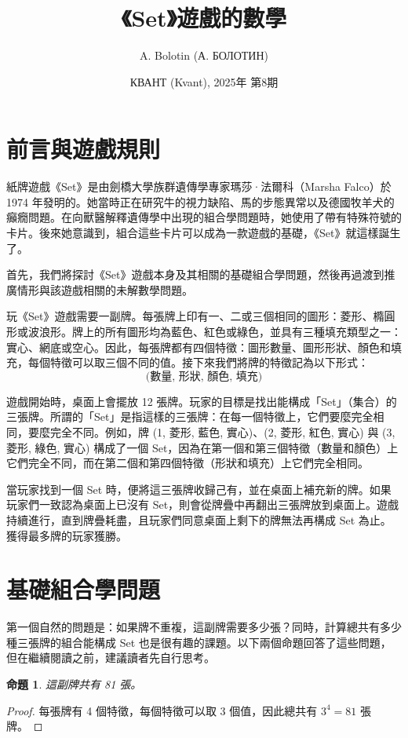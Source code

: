 \documentclass[12pt, a4paper]{article}
\newtheorem{proposition}{命題}
\begin{document}
\title{《Set》遊戲的數學}
\author{A. Bolotin (А. БОЛОТИН)}
\date{КВАНТ (Kvant), 2025年 第8期}
\maketitle

\section*{前言與遊戲規則}

紙牌遊戲《Set》是由劍橋大學族群遺傳學專家瑪莎·法爾科（Marsha Falco）於 1974 年發明的。她當時正在研究牛的視力缺陷、馬的步態異常以及德國牧羊犬的癲癇問題。在向獸醫解釋遺傳學中出現的組合學問題時，她使用了帶有特殊符號的卡片。後來她意識到，組合這些卡片可以成為一款遊戲的基礎，《Set》就這樣誕生了。

首先，我們將探討《Set》遊戲本身及其相關的基礎組合學問題，然後再過渡到推廣情形與該遊戲相關的未解數學問題。

玩《Set》遊戲需要一副牌。每張牌上印有一、二或三個相同的圖形：菱形、橢圓形或波浪形。牌上的所有圖形均為藍色、紅色或綠色，並具有三種填充類型之一：實心、網底或空心。因此，每張牌都有四個特徵：圖形數量、圖形形狀、顏色和填充，每個特徵可以取三個不同的值。接下來我們將牌的特徵記為以下形式：
$$ \text{(數量, 形狀, 顏色, 填充)} $$

遊戲開始時，桌面上會擺放 12 張牌。玩家的目標是找出能構成「Set」（集合）的三張牌。所謂的「Set」是指這樣的三張牌：在每一個特徵上，它們要麼完全相同，要麼完全不同。例如，牌 (1, 菱形, 藍色, 實心)、(2, 菱形, 紅色, 實心) 與 (3, 菱形, 綠色, 實心) 構成了一個 Set，因為在第一個和第三個特徵（數量和顏色）上它們完全不同，而在第二個和第四個特徵（形狀和填充）上它們完全相同。

當玩家找到一個 Set 時，便將這三張牌收歸己有，並在桌面上補充新的牌。如果玩家們一致認為桌面上已沒有 Set，則會從牌疊中再翻出三張牌放到桌面上。遊戲持續進行，直到牌疊耗盡，且玩家們同意桌面上剩下的牌無法再構成 Set 為止。獲得最多牌的玩家獲勝。

\section*{基礎組合學問題}

第一個自然的問題是：如果牌不重複，這副牌需要多少張？同時，計算總共有多少種三張牌的組合能構成 Set 也是很有趣的課題。以下兩個命題回答了這些問題，但在繼續閱讀之前，建議讀者先自行思考。

\begin{proposition}
這副牌共有 81 張。
\end{proposition}
\begin{proof}
每張牌有 4 個特徵，每個特徵可以取 3 個值，因此總共有 $3^{4}=81$ 張牌。
\end{proof}
\end{document}
